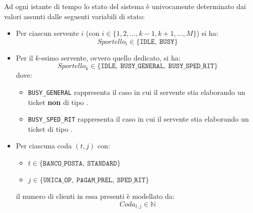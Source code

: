 Ad ogni istante di tempo lo stato del sistema è univocamente determinato dai valori assunti dalle seguenti variabili di stato:
\begin{itemize}
\item Per ciascun servente $i$ (con $i \in \lbrace 1, 2, \dots, k-1, k+1, \dots, M \rbrace$) si ha:
\begin{equation}
Sportello_i \in \lbrace \mathtt{IDLE},\ \mathtt{BUSY} \rbrace 
\end{equation}
\item Per il $k$-esimo servente, ovvero quello dedicato, si ha:
\begin{equation}
Sportello_k \in \lbrace \mathtt{IDLE},\ \mathtt{BUSY\_GENERAL},\ \mathtt{BUSY\_SPED\_RIT}\rbrace 
\end{equation}
dove:
\begin{itemize}
\item \texttt{BUSY\_GENERAL} rappresenta il caso in cui il servente stia elaborando un ticket \textbf{non} di tipo \sr{}.
\item \texttt{BUSY\_SPED\_RIT} rappresenta il caso in cui il servente stia elaborando un ticket di tipo \sr{}.
\end{itemize}
\item Per ciascuna coda $(t, j)$ con:
\begin{itemize}
\item $t \in \lbrace \mathtt{BANCO\_POSTA},\ \mathtt{STANDARD}\rbrace$
\item $j \in \lbrace \mathtt{UNICA\_OP},\ \mathtt{PAGAM\_PREL},\ \mathtt{SPED\_RIT} \rbrace$
\end{itemize}
il numero di clienti in essa presenti è modellato da:
\begin{equation}
Coda_{t,j} \in \mathbb{N} 
\end{equation}
\end{itemize}
